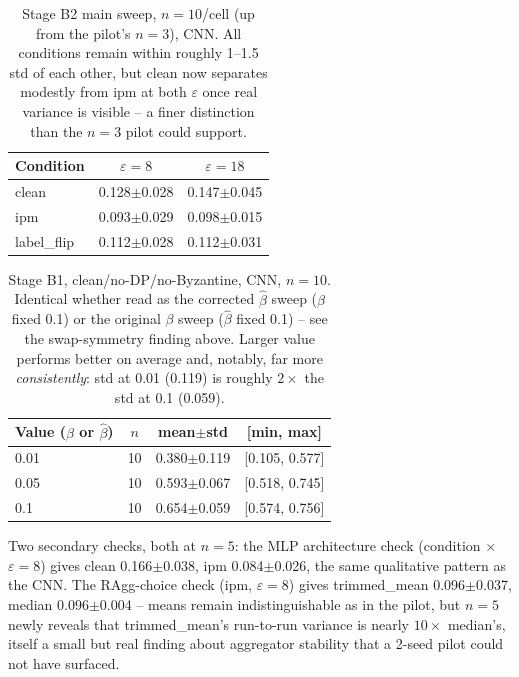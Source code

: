 \documentclass{article}
\begin{document}
\begin{table}[t]
\centering\small
\begin{tabular}{lcc}
\toprule
Condition & $\varepsilon{=}8$ & $\varepsilon{=}18$ \\
\midrule
clean & 0.128$\pm$0.028 & 0.147$\pm$0.045 \\
ipm & 0.093$\pm$0.029 & 0.098$\pm$0.015 \\
label\_flip & 0.112$\pm$0.028 & 0.112$\pm$0.031 \\
\bottomrule
\end{tabular}
\caption{Stage B2 main sweep, $n{=}10$/cell (up from the pilot's $n{=}3$),
CNN. All conditions remain within roughly 1--1.5 std of each other, but
clean now separates modestly from ipm at both $\varepsilon$ once real
variance is visible -- a finer distinction than the $n{=}3$ pilot could
support.}
\label{tab:mnist-b2}
\end{table}

\begin{table}[t]
\centering\small
\begin{tabular}{lccc}
\toprule
Value ($\beta$ or $\hat\beta$) & $n$ & mean$\pm$std & [min, max] \\
\midrule
0.01 & 10 & 0.380$\pm$0.119 & [0.105, 0.577] \\
0.05 & 10 & 0.593$\pm$0.067 & [0.518, 0.745] \\
0.1  & 10 & 0.654$\pm$0.059 & [0.574, 0.756] \\
\bottomrule
\end{tabular}
\caption{Stage B1, clean/no-DP/no-Byzantine, CNN, $n{=}10$. Identical whether
read as the corrected $\hat\beta$ sweep ($\beta$ fixed 0.1) or the original
$\beta$ sweep ($\hat\beta$ fixed 0.1) -- see the swap-symmetry finding above.
Larger value performs better on average and, notably, far more
\emph{consistently}: std at 0.01 (0.119) is roughly $2\times$ the std at 0.1
(0.059).}
\label{tab:mnist-b1}
\end{table}

Two secondary checks, both at $n{=}5$: the MLP architecture check (condition
$\times$ $\varepsilon{=}8$) gives clean 0.166$\pm$0.038, ipm 0.084$\pm$0.026,
the same qualitative pattern as the CNN. The RAgg-choice check (ipm,
$\varepsilon{=}8$) gives trimmed\_mean 0.096$\pm$0.037, median 0.096$\pm$0.004
-- means remain indistinguishable as in the pilot, but $n{=}5$ newly reveals
that trimmed\_mean's run-to-run variance is nearly $10\times$ median's,
itself a small but real finding about aggregator stability that a 2-seed
pilot could not have surfaced.
\end{document}

